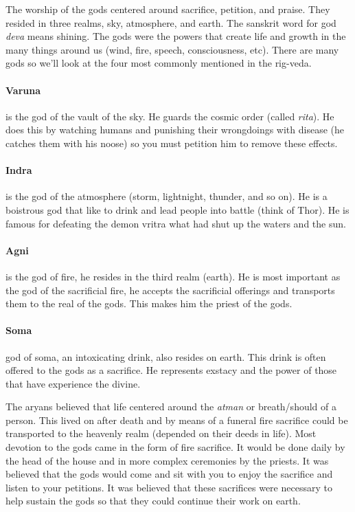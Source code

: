 \documentclass{article}
\begin{document}
The worship of the gods centered around sacrifice, petition, and praise. They resided in three realms, sky, atmosphere, and earth. The sanskrit word for god \emph{deva} means shining. The gods were the powers that create life and growth in the many things around us (wind, fire, speech, consciousness, etc). There are many gods so we'll look at the four most commonly mentioned in the rig-veda.

\paragraph{Varuna}
\label{par:varuna}
is the god of the vault of the sky. He guards the cosmic order (called \emph{rita}). He does this by watching humans and punishing their wrongdoings with disease (he catches them with his noose) so you must petition him to remove these effects.

\paragraph{Indra}
\label{par:indra}
is the god of the atmosphere (storm, lightnight, thunder, and so on). He is a boistrous god that like to drink and lead people into battle (think of Thor). He is famous for defeating the demon vritra what had shut up the waters and the sun.

\paragraph{Agni}
\label{par:agni}
is the god of fire, he resides in the third realm (earth). He is most important as the god of the sacrificial fire, he accepts the sacrificial offerings and transports them to the real of the gods. This makes him the priest of the gods.

\paragraph{Soma}
\label{par:soma}
god of soma, an intoxicating drink, also resides on earth. This drink is often offered to the gods as a sacrifice. He represents exstacy and the power of those that have experience the divine.

The aryans believed that life centered around the \emph{atman} or breath/should of a person. This lived on after death and by means of a funeral fire sacrifice could be transported to the heavenly realm (depended on their deeds in life). Most devotion to the gods came in the form of fire sacrifice. It would be done daily by the head of the house and in more complex ceremonies by the priests. It was believed that the gods would come and sit with you to enjoy the sacrifice and listen to your petitions. It was believed that these sacrifices were necessary to help sustain the gods so that they could continue their work on earth.
\end{document}
